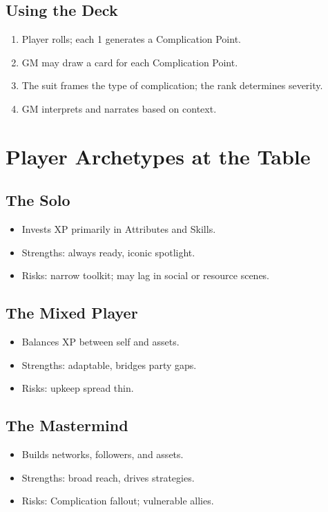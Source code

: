 \documentclass[11pt]{article}
\begin{document}
\subsection{Using the Deck}
\begin{enumerate}
    \item Player rolls; each 1 generates a Complication Point.
    \item GM may draw a card for each Complication Point.
    \item The suit frames the type of complication; the rank determines severity.
    \item GM interprets and narrates based on context.
\end{enumerate}

\section{Player Archetypes at the Table}

\subsection{The Solo}
\begin{itemize}
    \item Invests XP primarily in Attributes and Skills.
    \item Strengths: always ready, iconic spotlight.
    \item Risks: narrow toolkit; may lag in social or resource scenes.
\end{itemize}

\subsection{The Mixed Player}
\begin{itemize}
    \item Balances XP between self and assets.
    \item Strengths: adaptable, bridges party gaps.
    \item Risks: upkeep spread thin.
\end{itemize}

\subsection{The Mastermind}
\begin{itemize}
    \item Builds networks, followers, and assets.
    \item Strengths: broad reach, drives strategies.
    \item Risks: Complication fallout; vulnerable allies.
\end{itemize}
\end{document}
